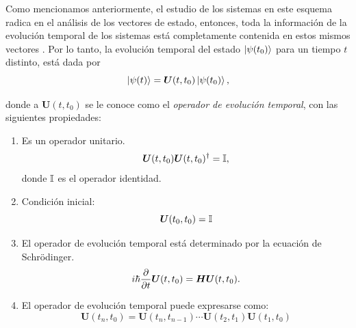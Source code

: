 \documentclass[../Main.tex]{subfiles}
\begin{document}
Como mencionamos anteriormente, el estudio de los sistemas en este esquema radica en el análisis de los vectores de estado, entonces, toda la información de la evolución temporal de los sistemas está completamente contenida en estos mismos vectores \cite{Sakurai2011}. Por lo tanto, la evolución temporal del estado $\ket{\psi(t_0)}$ para un tiempo $t$ distinto, está dada por
\begin{equation}
    \ket{\psi(t)}=\bm{U}(t,t_0)\ket{\psi(t_0)},
    \label{def:evolucion_ket}
\end{equation}

donde a $\bm{U}(t,t_0)$ se le conoce como el \emph{operador de evolución temporal}, con las siguientes propiedades:
\begin{enumerate}
    \item Es un operador unitario.
        \begin{equation}
            \bm{U}(t,t_0)\bm{U}(t,t_0)^\dagger=\mathbb{I},
        \end{equation}
        donde $\bm{\mathbb{I}}$ es el operador identidad.
    \item Condición inicial: 
        \begin{equation}
            \bm{U}(t_0,t_0)=\bm{\mathbb{I}}
        \end{equation}
    \item El operador de evolución temporal está determinado por la ecuación de Schrödinger.
            \begin{equation}
                i\hbar\pdv{t}\bm{U}(t,t_0)=\bm{H}\bm{U}(t,t_0).
                \label{eq:Schrondiger_operador_temporal}
            \end{equation}
    \item El operador de evolución temporal puede expresarse como:
            \begin{equation}
                \bm{U}(t_n,t_0)=\bm{U}(t_n,t_{n-1})\cdots\bm{U}(t_2,t_1)\bm{U}(t_1,t_0)
            \end{equation}
\end{enumerate}
\end{document}
